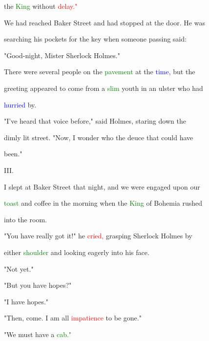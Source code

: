  the \textcolor{green}{King} without \textcolor{red}{delay."}



 We had reached Baker Street and had stopped at the door. He was

 searching his pockets for the key when someone passing said:



 "Good-night, Mister Sherlock Holmes."



 There were several people on the \textcolor{green}{pavement} at the \textcolor{blue}{time,} but the

 greeting appeared to come from a \textcolor{green}{slim} \textcolor{BurntOrange}{youth} in an ulster who had

 \textcolor{blue}{hurried} by.



 "I've heard that voice before," said Holmes, \textcolor{BurntOrange}{staring} down the

 dimly lit street. "Now, I wonder who the deuce that could have

 been."





 III.



 I slept at Baker Street that night, and we were engaged upon our

 \textcolor{green}{toast} and coffee in the morning when the \textcolor{green}{King} of Bohemia rushed

 into the room.



 "You have really got it!" he \textcolor{red}{cried,} grasping Sherlock Holmes by

 either \textcolor{green}{shoulder} and looking eagerly into his face.



 "Not yet."



 "But you have \textcolor{BurntOrange}{hopes?"}



 "I have \textcolor{BurntOrange}{hopes."}



 "Then, come. I am all \textcolor{red}{impatience} to be gone."



 "We must have a \textcolor{green}{cab."}



